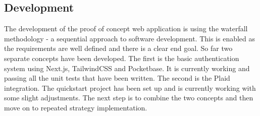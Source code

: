 \subsection{Development}
The development of the proof of concept web application is using the waterfall methodology - a sequential approach to software development. This is enabled as the requirements are well defined and there is a clear end goal. So far two separate concepts have been developed. The first is the basic authentication system using Next.js, TailwindCSS and Pocketbase. It is currently working and passing all the unit tests that have been written. The second is the Plaid integration. The quickstart project has been set up and is currently working with some slight adjustments. The next step is to combine the two concepts and then move on to repeated strategy implementation.
